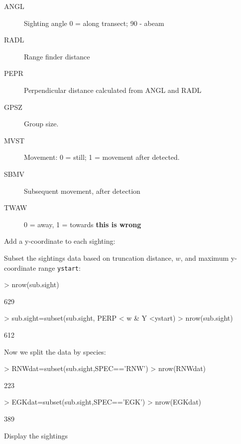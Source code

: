 \documentclass{article}
\begin{document}
\begin{description}
  \item[ANGL] Sighting angle 0 = along transect; 90 - abeam
  \item[RADL] Range finder distance
  \item[PEPR] Perpendicular distance calculated from ANGL and RADL
  \item[GPSZ] Group size.
  \item[MVST] Movement: 0 = still; 1 = movement after detected.
  \item[SBMV] Subsequent movement, after detection
  \item[TWAW] 0 = away, 1 = towards \textbf{this is wrong}
\end{description}

Add a y-coordinate to each sighting:
\begin{Schunk}
\end{Schunk}
Subset the sightings data based on truncation distance, $w$, and maximum y-coordinate range \texttt{ystart}:
\begin{Schunk}
\begin{Sinput}
> nrow(sub.sight)
\end{Sinput}
\begin{Soutput}
[1] 629
\end{Soutput}
\begin{Sinput}
> sub.sight=subset(sub.sight, PERP < w & Y <ystart)
> nrow(sub.sight)  
\end{Sinput}
\begin{Soutput}
[1] 612
\end{Soutput}
\end{Schunk}
Now we split the data by species:
\begin{Schunk}
\begin{Sinput}
> RNWdat=subset(sub.sight,SPEC=='RNW')
> nrow(RNWdat)
\end{Sinput}
\begin{Soutput}
[1] 223
\end{Soutput}
\begin{Sinput}
> EGKdat=subset(sub.sight,SPEC=='EGK')
> nrow(EGKdat)  
\end{Sinput}
\begin{Soutput}
[1] 389
\end{Soutput}
\end{Schunk}
Display the sightings
\end{document}
